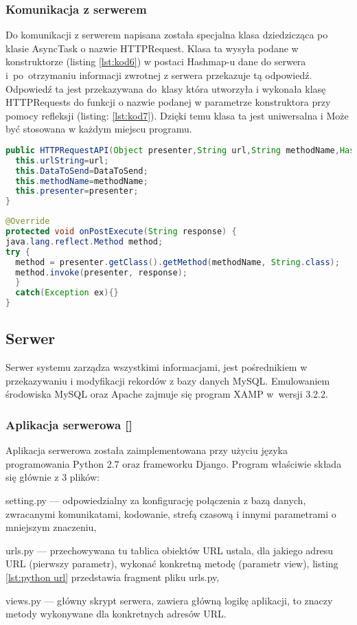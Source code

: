 	\subsubsection{Komunikacja z serwerem}
	Do komunikacji z serwerem napisana została specjalna klasa dziedzicząca po klasie AsyncTask o nazwie HTTPRequest. Klasa ta wysyła podane w konstruktorze (listing \ref{lst:kod6}) w postaci Hashmap-u dane do serwera i~po~otrzymaniu informacji zwrotnej z serwera przekazuje tą odpowiedź. Odpowiedź ta jest przekazywana do~klasy która utworzyła i wykonała klasę HTTPRequests do funkcji o nazwie podanej w parametrze konstruktora przy pomocy refleksji (listing: \ref{lst:kod7}). Dzięki temu klasa ta jest uniwersalna i Może być stosowana w każdym miejscu programu.
	
	\begin{lstlisting}[caption={Konstruktor klasy HTTPRequest.}, label={lst:kod6}, language=Java]
public HTTPRequestAPI(Object presenter,String url,String methodName,HashMap DataToSend) {
  this.urlString=url;
  this.DataToSend=DataToSend;
  this.methodName=methodName;
  this.presenter=presenter;
}
\end{lstlisting}	
	
\begin{lstlisting}[caption={Metoda OnPost zwracająca odpowied"z serwera.}, label={lst:kod7}, language=Java]
@Override
protected void onPostExecute(String response) {
java.lang.reflect.Method method;
try {
  method = presenter.getClass().getMethod(methodName, String.class);
  method.invoke(presenter, response);
  }
  catch(Exception ex){}
}
\end{lstlisting}	

\subsection{Serwer}
Serwer systemu zarządza wszystkimi informacjami, jest pośrednikiem w przekazywaniu i modyfikacji rekordów z bazy danych MySQL. Emulowaniem środowiska MySQL oraz Apache zajmuje się program XAMP w~wersji 3.2.2.
 
	\subsubsection{Aplikacja serwerowa [\StudentA]}\label{sec:apk serw}
	Aplikacja serwerowa została zaimplementowana przy użyciu języka programowania Python 2.7 oraz frameworku Django. Program  właściwie składa się głównie z 3 plików:
	\begin{itemize*}
		\item setting.py --- odpowiedzialny za konfigurację połączenia z bazą danych, zwracanymi komunikatami, kodowanie, strefą czasową i innymi parametrami o mniejszym znaczeniu,
		\item urls.py --- przechowywana tu tablica obiektów URL ustala, dla jakiego adresu URL (pierwszy parametr), wykonać konkretną metodę (parametr view), listing \ref{lst:python url} przedstawia fragment pliku urls.py,
		\item views.py --- główny skrypt serwera, zawiera główną logikę aplikacji, to znaczy metody wykonywane dla konkretnych adresów URL.
	\end{itemize*}

